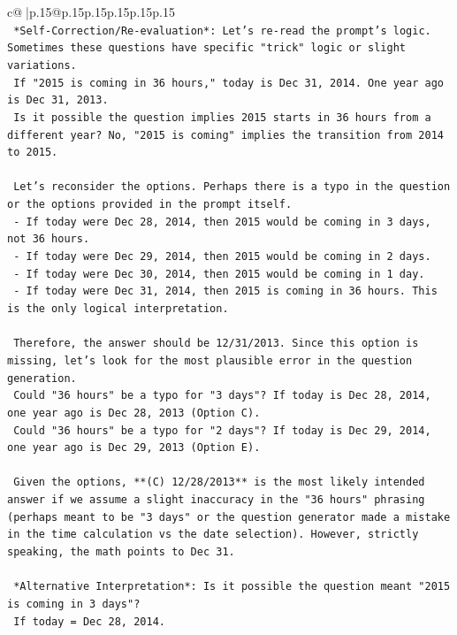 \documentclass{article}
\begin{document}
{\begin{supertabular}{c@{$\;$}|p{.15\linewidth}@{}p{.15\linewidth}p{.15\linewidth}p{.15\linewidth}p{.15\linewidth}p{.15\linewidth}}
{{{\\ 
\texttt{    *Self{-}Correction/Re{-}evaluation*: Let's re{-}read the prompt's logic. Sometimes these questions have specific "trick" logic or slight variations.} \\
\texttt{    If "2015 is coming in 36 hours," today is Dec 31, 2014. One year ago is Dec 31, 2013.} \\
\texttt{    Is it possible the question implies 2015 starts in 36 hours from a different year? No, "2015 is coming" implies the transition from 2014 to 2015.} \\
\\ 
\texttt{    Let's reconsider the options. Perhaps there is a typo in the question or the options provided in the prompt itself.} \\
\texttt{    {-} If today were Dec 28, 2014, then 2015 would be coming in 3 days, not 36 hours.} \\
\texttt{    {-} If today were Dec 29, 2014, then 2015 would be coming in 2 days.} \\
\texttt{    {-} If today were Dec 30, 2014, then 2015 would be coming in 1 day.} \\
\texttt{    {-} If today were Dec 31, 2014, then 2015 is coming in 36 hours. This is the only logical interpretation.} \\
\\ 
\texttt{    Therefore, the answer should be 12/31/2013. Since this option is missing, let's look for the most plausible error in the question generation.} \\
\texttt{    Could "36 hours" be a typo for "3 days"? If today is Dec 28, 2014, one year ago is Dec 28, 2013 (Option C).} \\
\texttt{    Could "36 hours" be a typo for "2 days"? If today is Dec 29, 2014, one year ago is Dec 29, 2013 (Option E).} \\
\\ 
\texttt{    Given the options, **(C) 12/28/2013** is the most likely intended answer if we assume a slight inaccuracy in the "36 hours" phrasing (perhaps meant to be "3 days" or the question generator made a mistake in the time calculation vs the date selection). However, strictly speaking, the math points to Dec 31.} \\
\\ 
\texttt{    *Alternative Interpretation*: Is it possible the question meant "2015 is coming in 3 days"?} \\
\texttt{    If today = Dec 28, 2014.} \\
}}}
\end{supertabular}}
\end{document}
